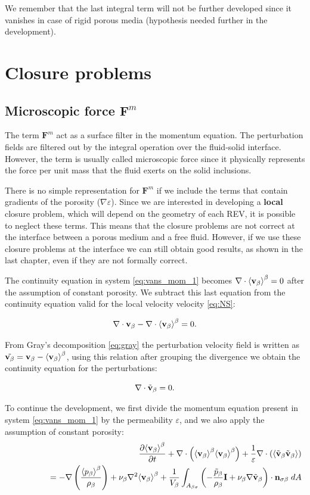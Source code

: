We remember that the last integral term will not be further developed since it vanishes in case of rigid porous media (hypothesis needed further in the development).



\section{Closure problems}

\subsection{Microscopic force $\mathbf{F}^m$}
\label{ch:closure_fm}
The term $\mathbf{F}^m$ act as a surface filter in the momentum equation. The perturbation fields are filtered out by the integral operation over the fluid-solid interface. However, the term is usually called microscopic force since it physically represents the force per unit mass that the fluid exerts on the solid inclusions.

There is no simple representation for $\mathbf{F}^m$ if we include the terms that contain gradients of the porosity ($\nabla \varepsilon$).
Since we are interested in developing a \textbf{local} closure problem, which will depend on the geometry of each REV, it is possible to neglect these terms.
This means that the closure problems are not correct at the interface between a porous medium and a free fluid. 
However, if we use these closure problems at the interface we can still obtain good results, as shown in the last chapter, even if they are not formally correct.

The continuity equation in system \eqref{eq:vans_mom_1} becomes $ \nabla \cdot  {\left< \textbf{v}_{\beta}\right>}^{\beta}=0$ after the assumption of constant porosity.
We subtract this last equation from the continuity equation valid for the local velocity velocity \eqref{eq:NS}:

$$
\nabla \cdot  \textbf{v}_{\beta} - \nabla \cdot  {\left< \textbf{v}_{\beta}\right>}^{\beta} = 0.
$$

From Gray's decomposition \eqref{eq:gray} the perturbation velocity field is written as $\tilde{\textbf{v}_{\beta}} = \textbf{v}_{\beta} - {\left< \textbf{v}_{\beta} \right>}^{\beta}$, using this relation after grouping the divergence we obtain the continuity equation for the perturbations:

\begin{equation}
\nabla \cdot \tilde{\textbf{v}}_{\beta} = 0.
\end{equation}


To continue the development, we first divide the momentum equation present in system \eqref{eq:vans_mom_1} by the permeability $\varepsilon$, and we also apply the assumption of constant porosity:
\begin{eqnarray}
&& \dfrac{\partial {\left< \textbf{v}_{\beta}\right>}^{\beta}}{\partial t} + \nabla \cdot \left({\left< \textbf{v}_{\beta} \right>}^{\beta}{\left< \textbf{v}_{\beta} \right>}^{\beta}\right)   + \dfrac{1}{\varepsilon}\nabla \cdot \left({\left< \tilde{\textbf{v}}_{\beta} \tilde{\textbf{v}}_{\beta} \right>}\right)   \nonumber \\
&& \qquad \qquad = - \nabla \left(\dfrac{{\left< p_{\beta} \right>}^{\beta}}{\rho_{\beta}}\right) + \nu_{\beta}  \nabla^2 {\left< \textbf{v}_{\beta} \right>}^{\beta} + \dfrac{1}{V_\beta} \displaystyle\int_{A_{\beta \sigma}} \left(-\dfrac{\tilde{p}_{\beta}}{\rho_{\beta}} \mathbf{I}  + \nu_{\beta} \nabla \tilde{\textbf{v}}_{\beta} \right)\cdot \mathbf{n}_{\sigma \beta} \;dA  \nonumber
\end{eqnarray}


